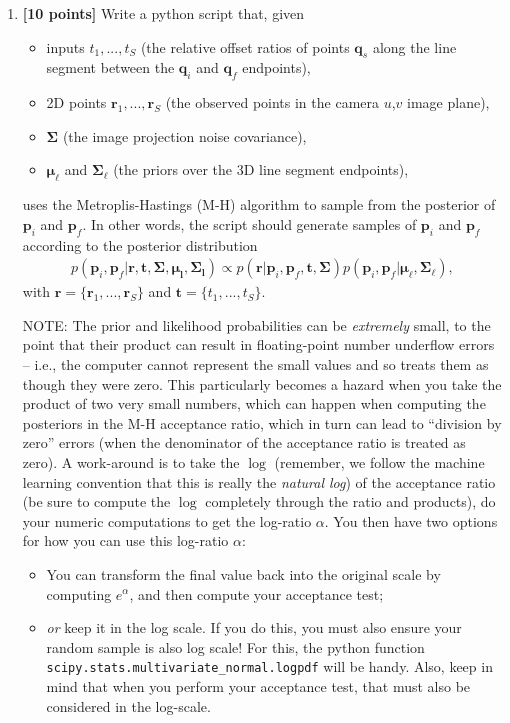 \documentclass[10pt]{article}
\begin{document}
\begin{enumerate}

\item {\bf [10 points]} Write a python script that, given
\begin{itemize}
\item inputs $t_1, ..., t_S$ (the relative offset ratios of points $\mathbf{q}_s$ along the line segment between the $\mathbf{q}_i$ and $\mathbf{q}_f$ endpoints),
\item 2D points $\mathbf{r}_1, ..., \mathbf{r}_S$ (the observed points in the camera $u$,$v$ image plane),
\item $\boldsymbol{\Sigma}$ (the image projection noise covariance),
\item $\boldsymbol{\mu}_{\boldsymbol{\ell}}$ and $\boldsymbol{\Sigma}_{\boldsymbol{\ell}}$ (the priors over the 3D line segment endpoints),
\end{itemize}
uses the Metroplis-Hastings (M-H) algorithm to sample from the posterior of $\mathbf{p}_i$ and $\mathbf{p}_f$.  In other words, the script should generate samples of $\mathbf{p}_i$ and $\mathbf{p}_f$ according to the posterior distribution
\begin{eqnarray*}
p(\mathbf{p}_i, \mathbf{p}_f | \mathbf{r}, \mathbf{t}, \boldsymbol{\Sigma}, \boldsymbol{\mu}_\mathbf{l}, \boldsymbol{\Sigma}_\mathbf{l}) 
\propto 
p(\mathbf{r} | \mathbf{p}_i, \mathbf{p}_f, \mathbf{t}, \boldsymbol{\Sigma})
p(\mathbf{p}_i, \mathbf{p}_f | \boldsymbol{\mu}_\mathbf{\ell}, \boldsymbol{\Sigma}_\mathbf{\ell}),
\end{eqnarray*}
with $\mathbf{r} = \{\mathbf{r}_1, ..., \mathbf{r}_S \}$ and $\mathbf{t} = \{t_1, ..., t_S \}$.

NOTE: The prior and likelihood probabilities can be {\em extremely} small, to the point that their product can result in floating-point number underflow errors -- i.e., the computer cannot represent the small values and so treats them as though they were zero. This particularly becomes a hazard when you take the product of two very small numbers, which can happen when computing the posteriors in the M-H acceptance ratio, which in turn can lead to ``division by zero'' errors (when the denominator of the acceptance ratio is treated as zero).  A work-around is to take the $\log$ (remember, we follow the machine learning convention that this is really the {\em natural log}) of the acceptance ratio (be sure to compute the $\log$ completely through the ratio and products), do your numeric computations to get the log-ratio $\alpha$. You then have two options for how you can use this log-ratio $\alpha$:
\begin{itemize}
\item You can transform the final value back into the original scale by computing $e^{\alpha}$, and then compute your acceptance test;
\item {\em or} keep it in the log scale. If you do this, you must also ensure your random sample is also log scale! For this, the python function {\tt scipy.stats.multivariate\_normal.logpdf} will be handy. Also, keep in mind that when you perform your acceptance test, that must also be considered in the log-scale.
\end{itemize}


\end{enumerate}
\end{document}

